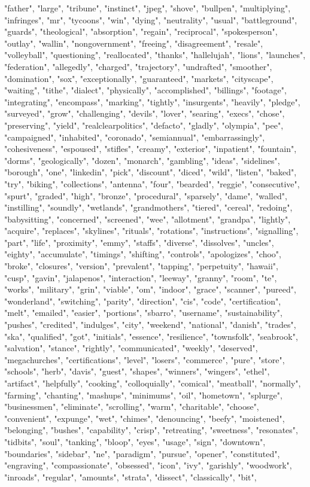 "father", "large", "tribune", "instinct", "jpeg", "shove", "bullpen", "multiplying", "infringes", "mr", "tycoons", "win", "dying", "neutrality", "usual", "battleground", "guards", "theological", "absorption", "regain", "reciprocal", "spokesperson", "outlay", "wallin", "nongovernment", "freeing", "disagreement", "resale", "volleyball", "questioning", "reallocated", "thanks", "hallelujah", "lions", "launches", "federation", "allegedly", "charged", "trajectory", "undrafted", "smoother", "domination", "sox", "exceptionally", "guaranteed", "markets", "cityscape", "waiting", "tithe", "dialect", "physically", "accomplished", "billings", "footage", "integrating", "encompass", "marking", "tightly", "insurgents", "heavily", "pledge", "surveyed", "grow", "challenging", "devils", "lover", "searing", "execs", "chose", "preserving", "yield", "realclearpolitics", "defacto", "gladly", "olympia", "pee", "campaigned", "inhabited", "coronado", "semiannual", "embarrassingly", "cohesiveness", "espoused", "stifles", "creamy", "exterior", "inpatient", "fountain", "dorms", "geologically", "dozen", "monarch", "gambling", "ideas", "sidelines", "borough", "one", "linkedin", "pick", "discount", "diced", "wild", "listen", "baked", "try", "biking", "collections", "antenna", "four", "bearded", "reggie", "consecutive", "spurt", "graded", "high", "bronze", "procedural", "sparsely", "dame", "walled", "instilling", "soundly", "wetlands", "grandmothers", "tiered", "cereal", "redoing", "babysitting", "concerned", "screened", "wee", "allotment", "grandpa", "lightly", "acquire", "replaces", "skylines", "rituals", "rotations", "instructions", "signalling", "part", "life", "proximity", "emmy", "staffs", "diverse", "dissolves", "uncles", "eighty", "accumulate", "timings", "shifting", "controls", "apologizes", "choo", "broke", "closures", "version", "prevalent", "tapping", "perpetuity", "hawaii", "cusp", "gavin", "jalapenos", "interaction", "leeway", "granny", "room", "te", "works", "military", "grin", "viable", "om", "indoor", "grace", "scanner", "pureed", "wonderland", "switching", "parity", "direction", "cis", "code", "certification", "melt", "emailed", "easier", "portions", "sbarro", "username", "sustainability", "pushes", "credited", "indulges", "city", "weekend", "national", "danish", "trades", "ska", "qualified", "got", "initials", "essence", "resilience", "townsfolk", "seabrook", "salvation", "stance", "rightly", "communicated", "weekly", "deserved", "megachurches", "certifications", "level", "losers", "commerce", "pure", "store", "schools", "herb", "davis", "guest", "shapes", "winners", "wingers", "ethel", "artifact", "helpfully", "cooking", "colloquially", "comical", "meatball", "normally", "farming", "chanting", "mashups", "minimums", "oil", "hometown", "splurge", "businessmen", "eliminate", "scrolling", "warm", "charitable", "choose", "convenient", "expunge", "wet", "chimes", "denouncing", "beefy", "moistened", "belonging", "bushes", "capability", "crisp", "retreating", "sweetness", "resonates", "tidbits", "soul", "tanking", "bloop", "eyes", "usage", "sign", "downtown", "boundaries", "sidebar", "ne", "paradigm", "pursue", "opener", "constituted", "engraving", "compassionate", "obsessed", "icon", "ivy", "garishly", "woodwork", "inroads", "regular", "amounts", "strata", "dissect", "classically", "bit", 